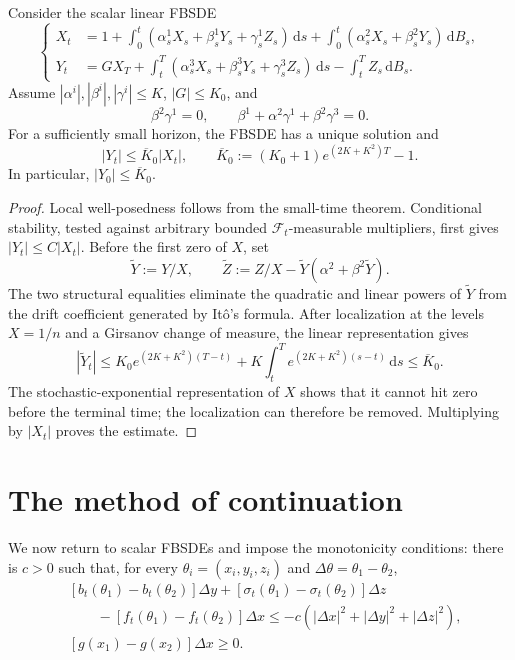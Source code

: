 \begin{thm}
Consider the scalar linear FBSDE
\[
\left\{
\begin{aligned}
  X_t
  &=1+\int_0^t(\alpha_s^1X_s+\beta_s^1Y_s+\gamma_s^1Z_s)\,\mathrm ds
      +\int_0^t(\alpha_s^2X_s+\beta_s^2Y_s)\,\mathrm dB_s,\\
  Y_t
  &=GX_T+\int_t^T(\alpha_s^3X_s+\beta_s^3Y_s+\gamma_s^3Z_s)
      \,\mathrm ds
      -\int_t^T Z_s\,\mathrm dB_s.
\end{aligned}
\right.
\]
Assume
$|\alpha^i|,|\beta^i|,|\gamma^i|\le K$, $|G|\le K_0$, and
\[
  \beta^2\gamma^1=0,
  \qquad
  \beta^1+\alpha^2\gamma^1+\beta^2\gamma^3=0.
\]
For a sufficiently small horizon, the FBSDE has a unique solution and
\[
  |Y_t|\le\overline K_0|X_t|,
  \qquad
  \overline K_0:=(K_0+1)e^{(2K+K^2)T}-1.
\]
In particular, $|Y_0|\le\overline K_0$.
\end{thm}

\begin{proof}
Local well-posedness follows from the small-time theorem.  Conditional
stability, tested against arbitrary bounded $\mathcal F_t$-measurable
multipliers, first gives $|Y_t|\le C|X_t|$.  Before the first zero of
$X$, set
\[
  \widetilde Y:=Y/X,
  \qquad
  \widetilde Z:=Z/X-\widetilde Y(\alpha^2+\beta^2\widetilde Y).
\]
The two structural equalities eliminate the quadratic and linear powers
of $\widetilde Y$ from the drift coefficient generated by It\^o's
formula.  After localization at the levels $X=1/n$ and a Girsanov change
of measure, the linear representation gives
\[
  |\widetilde Y_t|
  \le K_0e^{(2K+K^2)(T-t)}
      +K\int_t^T e^{(2K+K^2)(s-t)}\,\mathrm ds
  \le\overline K_0.
\]
The stochastic-exponential representation of $X$ shows that it cannot
hit zero before the terminal time; the localization can therefore be
removed.  Multiplying by $|X_t|$ proves the estimate.
\end{proof}

\section{The method of continuation}

We now return to scalar FBSDEs and impose the monotonicity conditions:
there is $c>0$ such that, for every
$\theta_i=(x_i,y_i,z_i)$ and
$\Delta\theta=\theta_1-\theta_2$,
\[
\begin{aligned}
  &[b_t(\theta_1)-b_t(\theta_2)]\Delta y
   +[\sigma_t(\theta_1)-\sigma_t(\theta_2)]\Delta z\\
  &\qquad-[f_t(\theta_1)-f_t(\theta_2)]\Delta x
  \le-c(|\Delta x|^2+|\Delta y|^2+|\Delta z|^2),\\
  &[g(x_1)-g(x_2)]\Delta x\ge0.
\end{aligned}
\]


